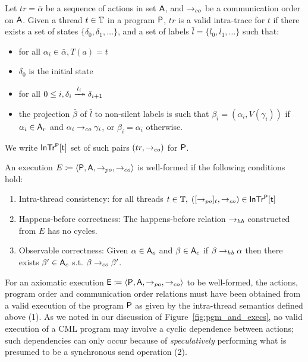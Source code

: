 \begin{definition}
\label{def:intra-trace}
Let $tr = \bar{\alpha}$ be a sequence of actions in set ${\sf A}$, and
$\rightarrow_{co}$ be a communication order on ${\sf A}$. Given a thread
$t \in \mathbb{T}$ in a program ${\sf P}$, $tr$ is a valid intra-trace for
$t$ if there exists a set of states $\{\delta_0, \delta_1, \ldots \}$, and a
set of labels $\bar{l} = \{l_0, l_1,\ldots\}$ such that:
%
\begin{itemize}
\item for all $\alpha_i \in \bar{\alpha}, T(a) = t$
\item $\delta_0$ is the initial state \ready
\item for all $0 \leq i, \delta_{i} \intratrans{l_i} \delta_{i+1}$
\item the projection $\bar{\beta}$ of $\bar{l}$ to non-silent labels is such
	that $\beta_i = (\alpha_i, V(\gamma_i))$ if $\alpha_i \in {\sf A}_r$ and
	$\alpha_i \rightarrow_{co} \gamma_i$, or $\beta_i = \alpha_i$ otherwise.

\end{itemize}
\end{definition}

\noindent We write $\sf InTr^{{\sf P}}[t]$ set of such pairs $(tr,\rightarrow_{co})$ for
${\sf P}$.

\begin{definition}
\label{def:well-formed}
An execution $E \coloneqq \langle {\sf P}, \allowbreak {\sf A}, \allowbreak \rightarrow_{po}, \allowbreak \rightarrow_{co} \rangle$ is well-formed if the following
conditions hold:
%
\begin{enumerate}
\item Intra-thread consistency: for all threads $t \in \mathbb{T},
	\;([\rightarrow_{po}]_{t}, \rightarrow_{co}) \in \sf InTr^{{\sf P}}[t]$
\item Happens-before correctness: The happens-before relation $\rightarrow_{hb}$ constructed
	from $E$ has no cycles.
\item Observable correctness: Given $\alpha  \in {\sf A}_{o}$ and  $\beta
	\in {\sf A}_{c}$ if $\beta \rightarrow_{hb} \alpha$ then there exists $\beta' \in
	{\sf A}_{c}$ s.t. $\beta \rightarrow_{co} \beta'$.
\end{enumerate}
\end{definition}

For an axiomatic execution ${\sf E} \coloneqq \langle {\sf P}, \allowbreak {\sf A}, \allowbreak \rightarrow_{po}, \allowbreak \rightarrow_{co} \rangle$ to be well-formed, the actions,
program order and communication order relations must have been obtained from a
valid execution of the program ${\sf P}$ as given by the intra-thread
semantics defined above (1). As we noted in our discussion of
Figure~\ref{fig:pgm_and_execs}, no valid execution of a CML program may involve
a cyclic dependence between actions; such dependencies can only occur because
of \emph{speculatively} performing what is presumed to be a synchronous send
operation (2).

